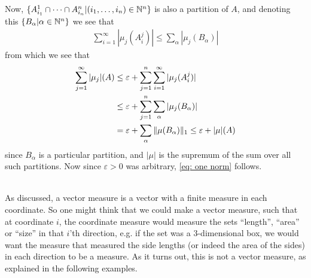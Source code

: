 \documentclass[../../main.tex]{subfiles}
\begin{document}
Now, $\{ A_{i_{1}}^{1} \cap \dots \cap A_{i_{n}}^{n} | (i_{1}, \dots, i_{n}) \in \N^{n} \}$ is also a partition of $A$, and denoting this $\{ B_{\alpha} | \alpha \in \N^{n} \}$ we see that
\begin{align*}
	\sum_{i=1}^{\infty} | \mu_{j} (A_{i}^{j}) | \le \sum_{\alpha} | \mu_{j} (B_{\alpha}) |
\end{align*}
from which we see that
\begin{align*}
	\sum_{j=1}^{\infty} |\mu_{j} | (A) &\le \varepsilon +  \sum_{j=1}^{n} \sum_{i=1}^{\infty} | \mu_{j}(A_{i}^{j})| \\
	&\le \varepsilon + \sum_{j=1}^{n} \sum_{\alpha} | \mu_{j}(B_{\alpha})| \\
	&= \varepsilon + \sum_{\alpha} \norm[1]{\mu (B_{\alpha})}   \le \varepsilon + |\mu|(A) \\
\end{align*}
since $B_{\alpha}$ is a particular partition, and $|\mu|$ is the supremum of the sum over all such partitions. Now since $\varepsilon>0$ was arbitrary, \eqref{eq: one norm} follows.




\text{ }\\
As discussed, a vector measure is a vector with a finite measure in each coordinate. So one might think that we could make a vector measure, such that at coordinate $i$, the coordinate measure would measure the sets ``length'', ``area'' or ``size'' in that $i$'th direction, e.g. if the set was a 3-dimensional box, we would want the measure that measured the side lengths (or indeed the area of the sides) in each direction to be a measure. As it turns out, this is not a vector measure, as explained in the following examples.
\end{document}
